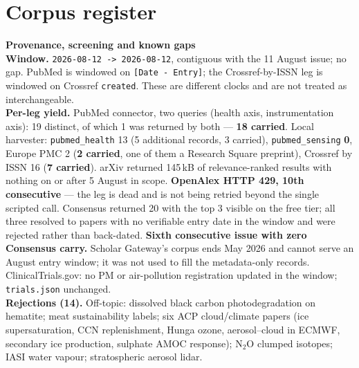 \documentclass[10pt]{article}
\begin{document}
\clearpage

\section*{\sffamily\bfseries\color{Deep}Corpus register}
\vspace{-1.5mm}{\color{Amber}\rule{\linewidth}{1.1pt}}\vspace{2.5mm}



\vspace{4mm}
\begin{keybox}
{\sffamily\bfseries\footnotesize\color{Deep}Provenance, screening and known gaps}\\[1.2mm]
{\fontsize{7.2}{8.8}\selectfont
\textbf{Window.} \texttt{2026-08-12 -> 2026-08-12}, contiguous with the 11 August issue;
no gap. PubMed is windowed on \texttt{[Date - Entry]}; the Crossref-by-ISSN leg is
windowed on Crossref \texttt{created}. These are different clocks and are not treated as
interchangeable.\\[0.8mm]
\textbf{Per-leg yield.} PubMed connector, two queries (health axis, instrumentation
axis): 19 distinct, of which 1 was returned by both --- \textbf{18 carried}. Local
harvester: \texttt{pubmed\_health} 13 (5 additional records, 3 carried),
\texttt{pubmed\_sensing} \textbf{0}, Europe PMC 2 (\textbf{2 carried}, one of them a
Research Square preprint), Crossref by ISSN 16 (\textbf{7 carried}). arXiv returned
145\,kB of relevance-ranked results with nothing on or after 5 August in scope.
\textbf{OpenAlex HTTP 429, 10th consecutive} --- the leg is dead and is not being retried
beyond the single scripted call. Consensus returned 20 with the top 3 visible on the free
tier; all three resolved to papers with no verifiable entry date in the window and were
rejected rather than back-dated. \textbf{Sixth consecutive issue with zero Consensus
carry.} Scholar Gateway's corpus ends May 2026 and cannot serve an August entry window;
it was not used to fill the metadata-only records.
ClinicalTrials.gov: no PM or air-pollution registration updated in the window;
\texttt{trials.json} unchanged.\\[0.8mm]
\textbf{Rejections (14).} Off-topic: dissolved black carbon photodegradation on hematite;
meat sustainability labels; six ACP cloud/climate papers (ice supersaturation, CCN
replenishment, Hunga ozone, aerosol--cloud in ECMWF, secondary ice production, sulphate
AMOC response); N$_2$O clumped isotopes; IASI water vapour; stratospheric aerosol lidar.
}
\end{keybox}
\end{document}
